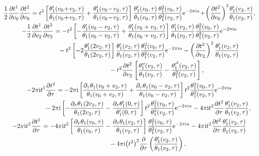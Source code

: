 \documentclass[pdftex]{sigma}%
\numberwithin{equation}{section}
\begin{document}
\begin{gather*}
\frac{1}{2}\frac{\partial t^1}{\partial v_0}\frac{\partial t^2}{\partial v_0}=t^2\left[\frac{\theta_1^{\prime}(v_0\!+\!v_2,\tau)}{\theta_1(v_0\!+\!v_2,\tau)} +\frac{\theta_1^{\prime}(v_0\!-\!v_2,\tau)}{\theta_1(v_0\!-\!v_2,\tau)}\right] \frac{\theta_1^{\prime}(v_0,\tau)}{\theta_1(v_0,\tau)} \frac{\theta_1^2(v_0,\tau)}{\theta_1^2(v_2,\tau)}{\rm e}^{-2\pi {\rm i} u}\!
+\!\left(\frac{\partial t^2}{\partial v_0}\right)^2\!\frac{\theta_1^{\prime}(v_2,\tau)}{\theta_1(v_2,\tau)},
\\
-\frac{1}{2}\frac{\partial t^1}{\partial v_2}\frac{\partial t^2}{\partial v_2}=-t^2\left[ - \frac{\theta_1^{\prime}(v_0-v_2,\tau)}{\theta_1(v_0-v_2,\tau)}
+\frac{\theta_1^{\prime}(v_0+v_2,\tau)}{\theta_1(v_0+v_2,\tau)}\right] \frac{\theta_1^{\prime}(v_2,\tau)}{\theta_1(v_2,\tau)} \frac{\theta_1^2(v_0,\tau)}{\theta_1^2(v_2,\tau)}{\rm e}^{-2\pi {\rm i} u}
\\ \hphantom{-\frac{1}{2}\frac{\partial t^1}{\partial v_2}\frac{\partial t^2}{\partial v_2}=}
{}-t^2\left[-2\frac{\theta_1^{\prime}(2v_2,\tau)}{\theta_1(2v_2,\tau)}\right] \frac{\theta_1^{\prime}(v_2,\tau)}{\theta_1(v_2,\tau)} \frac{\theta_1^2(v_0,\tau)}{\theta_1^2(v_2,\tau)}{\rm e}^{-2\pi {\rm i} u}
-\left(\frac{\partial t^2}{\partial v_2}\right)^2\frac{\theta_1^{\prime}(v_2,\tau)}{\theta_1(v_2,\tau)}
\\ \hphantom{-\frac{1}{2}\frac{\partial t^1}{\partial v_2}\frac{\partial t^2}{\partial v_2}=-t^2\bigg[}
{}-t^2\frac{\partial t^2}{\partial v_2}\left[\frac{\theta_1^{\prime\prime}(v_2,\tau)}{\theta_1(v_2,\tau)} -\frac{\theta_1^{\prime^2}(v_2,\tau)}{\theta_1^2(v_2,\tau)}\right],
\\
-2\pi {\rm i}t^1\frac{\partial t^2}{\partial \tau}=-2\pi {\rm i}\left[\frac{\partial_{\tau}\theta_1(v_0+v_2,\tau)}{\theta_1(v_0+v_2,\tau)} +\frac{\partial_{\tau}\theta_1(v_0-v_2,\tau)}{\theta_1(v_0-v_2,\tau)}\right]t^2 \frac{\theta_1^2(v_0,\tau)}{\theta_1^2(v_2,\tau)}{\rm e}^{-2\pi {\rm i} u}
\\ \hphantom{-2\pi {\rm i}t^1\frac{\partial t^2}{\partial \tau}=}
{}-2\pi {\rm i}\left[-\frac{\partial_{\tau}\theta_1(2v_2,\tau)}{\theta_1(2v_2,\tau)} -\frac{\partial_{\tau}\theta_1^{\prime}(0,\tau)}{\theta_1^{\prime}(0,\tau)}\right]t^2 \frac{\theta_1^2(v_0,\tau)}{\theta_1^2(v_2,\tau)}{\rm e}^{-2\pi {\rm i} u}
-4\pi {\rm i}t^2\frac{\partial t^2}{\partial \tau}\frac{\theta_1^{\prime}(v_2,\tau)}{\theta_1(v_2,\tau)},
\\
-2\pi {\rm i}t^2\frac{\partial t^1}{\partial \tau}=-4\pi {\rm i}t^2\left[\frac{\partial_{\tau}\theta_1(v_0,\tau)}{\theta_1(v_0,\tau)} -\frac{\partial_{\tau}\theta_1(v_2,\tau)}{\theta_1(v_2,\tau)}\right] \frac{\theta_1^2(v_0,\tau)}{\theta_1^2(v_2,\tau)}{\rm e}^{-2\pi {\rm i} u}
-4\pi {\rm i}t^2\frac{\partial t^2}{\partial \tau}\frac{\theta_1^{\prime}(v_2,\tau)}{\theta_1(v_2,\tau)}
\\ \hphantom{-2\pi {\rm i}t^2\frac{\partial t^1}{\partial \tau}=}
-4\pi {\rm i}\big(t^2\big)^2\frac{\partial}{\partial \tau}\left(\frac{\theta_1^{\prime}(v_2,\tau)}{\theta_1(v_2,\tau)}\right).
\end{gather*}
\end{document}
